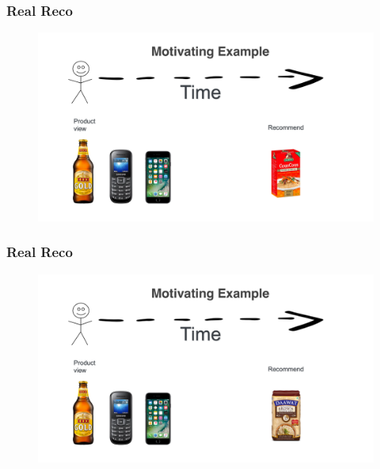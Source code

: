  \begin{frame}
  \frametitle{Real Reco}
 
 
   \begin{figure}[h!]
     \includegraphics[scale=0.25]{images/mot_ex3.png}
       \centering
       \label{motex1}
   \end{figure}
     
 \end{frame}

 \begin{frame}
  \frametitle{Real Reco}
 
 
   \begin{figure}[h!]
     \includegraphics[scale=0.25]{images/mot_ex4.png}
       \centering
       \label{motex1}
   \end{figure}
     
 \end{frame}






